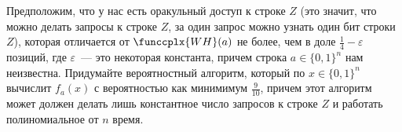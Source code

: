 Предположим, что у нас есть оракульный доступ к строке $Z$ (это значит, что можно делать запросы к строке
$Z$, за один запрос можно узнать один бит строки $Z$), которая отличается от $\funccplx{WH}(a)$ не более,
чем в доле $\frac{1}{4} - \varepsilon$ позиций, где $\varepsilon$~--- это некоторая константа, причем
строка $a \in \{0, 1\}^n$ нам неизвестна. Придумайте вероятностный алгоритм, который по $x \in \{0,1\}^n$
вычислит $f_a(x)$ с вероятностью как минимимум $\frac{9}{10}$, причем этот алгоритм может должен делать
лишь константное число запросов к строке $Z$ и работать полиномиальное от $n$ время.